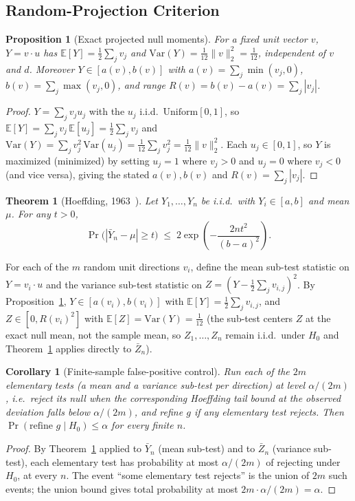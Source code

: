 \documentclass[11pt]{article}
\newtheorem{theorem}{Theorem}
\newtheorem{proposition}{Proposition}
\newtheorem{corollary}{Corollary}
\begin{document}
\subsection{Random-Projection Criterion}

\begin{proposition}[Exact projected null moments]
\label{prop:proj-moments}
For a fixed unit vector $v$, $Y = v\cdot u$ has $\mathbb{E}[Y] = \tfrac12\sum_j v_j$ and $\mathrm{Var}(Y) = \tfrac{1}{12}\|v\|_2^2 = \tfrac{1}{12}$, independent of $v$ and $d$. Moreover $Y \in [a(v), b(v)]$ with $a(v) = \sum_j \min(v_j,0)$, $b(v) = \sum_j \max(v_j,0)$, and range $R(v) = b(v)-a(v) = \sum_j |v_j|$.
\end{proposition}
\begin{proof}
$Y = \sum_j v_j u_j$ with the $u_j$ i.i.d.\ $\mathrm{Uniform}[0,1]$, so $\mathbb{E}[Y] = \sum_j v_j\,\mathbb{E}[u_j] = \tfrac12\sum_j v_j$ and $\mathrm{Var}(Y) = \sum_j v_j^2\,\mathrm{Var}(u_j) = \tfrac{1}{12}\sum_j v_j^2 = \tfrac{1}{12}\|v\|_2^2$. Each $u_j \in [0,1]$, so $Y$ is maximized (minimized) by setting $u_j = 1$ where $v_j>0$ and $u_j = 0$ where $v_j<0$ (and vice versa), giving the stated $a(v), b(v)$ and $R(v) = \sum_j|v_j|$.
\end{proof}

\begin{theorem}[Hoeffding, 1963~\cite{Hoeffding1963}]
\label{thm:hoeffding}
Let $Y_1,\ldots,Y_n$ be i.i.d.\ with $Y_i \in [a,b]$ and mean $\mu$. For any $t>0$,
\[
\Pr\big(|\bar{Y}_n - \mu| \geq t\big) \;\leq\; 2\exp\!\left(-\frac{2nt^2}{(b-a)^2}\right).
\]
\end{theorem}

For each of the $m$ random unit directions $v_i$, define the mean sub-test statistic on $Y = v_i\cdot u$ and the variance sub-test statistic on $Z = (Y - \tfrac12\sum_j v_{i,j})^2$. By Proposition~\ref{prop:proj-moments}, $Y \in [a(v_i), b(v_i)]$ with $\mathbb{E}[Y] = \tfrac12\sum_j v_{i,j}$, and $Z \in [0, R(v_i)^2]$ with $\mathbb{E}[Z] = \mathrm{Var}(Y) = \tfrac{1}{12}$ (the sub-test centers $Z$ at the exact null mean, not the sample mean, so $Z_1,\ldots,Z_n$ remain i.i.d.\ under $H_0$ and Theorem~\ref{thm:hoeffding} applies directly to $\bar Z_n$).

\begin{corollary}[Finite-sample false-positive control]
\label{cor:proj-fpr}
Run each of the $2m$ elementary tests (a mean and a variance sub-test per direction) at level $\alpha/(2m)$, i.e.\ reject its null when the corresponding Hoeffding tail bound at the observed deviation falls below $\alpha/(2m)$, and refine $g$ if any elementary test rejects. Then $\Pr(\text{refine } g \mid H_0) \leq \alpha$ for every finite $n$.
\end{corollary}
\begin{proof}
By Theorem~\ref{thm:hoeffding} applied to $\bar Y_n$ (mean sub-test) and to $\bar Z_n$ (variance sub-test), each elementary test has probability at most $\alpha/(2m)$ of rejecting under $H_0$, at every $n$. The event ``some elementary test rejects'' is the union of $2m$ such events; the union bound gives total probability at most $2m \cdot \alpha/(2m) = \alpha$.
\end{proof}
\end{document}
